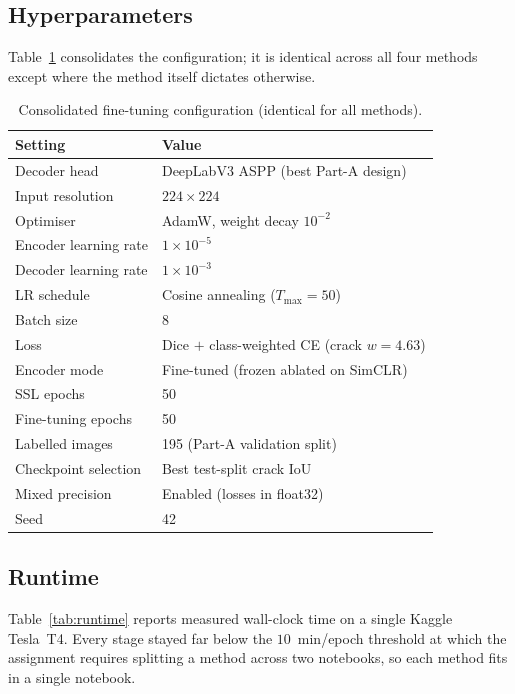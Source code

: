\documentclass[conference]{IEEEtran}
\begin{document}
\subsection{Hyperparameters}
Table~\ref{tab:hparams} consolidates the configuration; it is identical across all
four methods except where the method itself dictates otherwise.

\begin{table}[t]
\caption{Consolidated fine-tuning configuration (identical for all methods).}
\label{tab:hparams}
\centering
\small
\begin{tabular}{@{}ll@{}}
\toprule
\textbf{Setting} & \textbf{Value} \\
\midrule
Decoder head            & DeepLabV3 ASPP (best Part-A design) \\
Input resolution        & $224\times224$ \\
Optimiser               & AdamW, weight decay $10^{-2}$ \\
Encoder learning rate   & $1\times10^{-5}$ \\
Decoder learning rate   & $1\times10^{-3}$ \\
LR schedule             & Cosine annealing ($T_{\max}=50$) \\
Batch size              & 8 \\
Loss                    & Dice $+$ class-weighted CE (crack $w{=}4.63$) \\
Encoder mode            & Fine-tuned (frozen ablated on SimCLR) \\
SSL epochs              & 50 \\
Fine-tuning epochs      & 50 \\
Labelled images         & 195 (Part-A validation split) \\
Checkpoint selection    & Best test-split crack IoU \\
Mixed precision         & Enabled (losses in float32) \\
Seed                    & 42 \\
\bottomrule
\end{tabular}
\end{table}

\subsection{Runtime}
Table~\ref{tab:runtime} reports measured wall-clock time on a single Kaggle
Tesla~T4. Every stage stayed far below the $10$~min/epoch threshold at which the
assignment requires splitting a method across two notebooks, so each method fits in
a single notebook.
\end{document}
